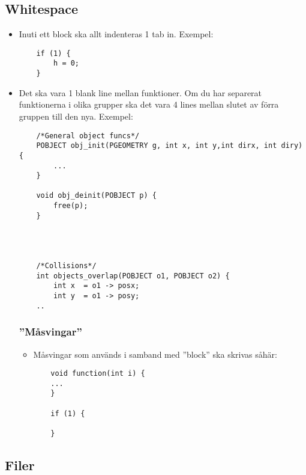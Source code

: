 \documentclass[a4paper]{article}
\begin{document}
\subsection{Whitespace} 
\label{sec:whitespace}
    \begin{itemize}
    
    \item Inuti ett block ska allt indenteras 1 tab in. 
    Exempel:
    \begin{lstlisting}
    if (1) {
        h = 0;
    }
    \end{lstlisting}
    
    \item Det ska vara 1 blank line mellan funktioner.
    Om du har separerat funktionerna i olika grupper ska det vara 4 lines mellan slutet av förra gruppen till den nya. 
    Exempel:
    \begin{lstlisting}
    /*General object funcs*/
    POBJECT obj_init(PGEOMETRY g, int x, int y,int dirx, int diry) {
    	...
    }
    
    void obj_deinit(POBJECT p) {
    	free(p);						
    }




    /*Collisions*/
    int objects_overlap(POBJECT o1, POBJECT o2) {
        int x  = o1 -> posx;
        int y  = o1 -> posy;
    ..
    \end{lstlisting}
    
    \subsubsection{''Måsvingar''} 
    \label{sec:måsvingar}
    \begin{itemize}
        \item Måsvingar som används i samband med ''block'' ska skrivas  såhär:   
    \begin{lstlisting}
    void function(int i) { 
    ...
    }
    
    if (1) {
    
    }
    \end{lstlisting}
    \end{itemize}
    
    \end{itemize}


\subsection{Filer}
\end{document}
